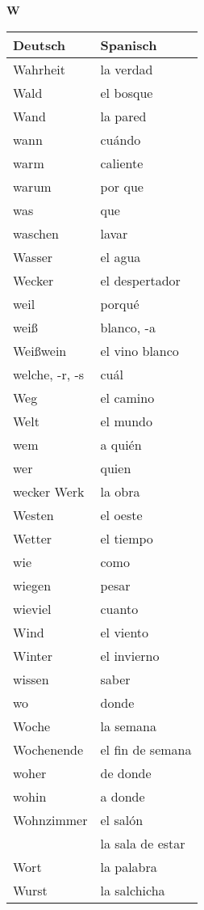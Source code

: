 \begin{flushright}\begin{Huge}\textbf{W}\end{Huge}\end{flushright}

\begin{longtable}{p{} p{}} 
\textbf{Deutsch}     & \textbf{Spanisch}                                       \\ \hline
\hline
\endhead %
Wahrheit & la verdad\\
Wald & el bosque\\
Wand & la pared\\
wann & cuándo\\
warm & caliente\\
warum & por que\\
was & que\\
waschen & lavar\\
Wasser & el agua\\
Wecker & el despertador\\
weil & porqué\\
weiß & blanco, -a\\
Weißwein & el vino blanco\\
welche, -r, -s & cuál \\
Weg & el camino\\
Welt & el mundo\\
wem & a quién\\
wer & quien\\wecker
Werk & la obra\\
Westen & el oeste\\
Wetter & el tiempo\\
wie & como\\
wiegen & pesar\\
wieviel & cuanto \\
Wind & el viento\\
Winter & el invierno\\
wissen & saber\\
wo & donde\\
Woche & la semana\\
Wochenende & el fin de semana\\
woher & de donde\\
wohin & a donde\\
Wohnzimmer & el salón\\
~ & la sala de estar\\
Wort & la palabra\\
Wurst & la salchicha\\
\end{longtable}
